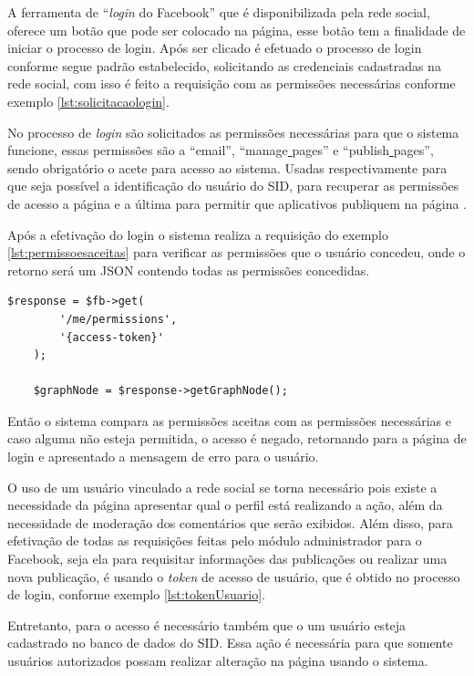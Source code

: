 A ferramenta de ``\textit{login} do Facebook'' que é disponibilizada pela rede social, oferece um botão que pode ser colocado na página, esse botão tem a finalidade de iniciar o processo de login. Após ser clicado é efetuado o processo de login conforme segue padrão estabelecido, solicitando as credenciais cadastradas na rede social, com isso é feito a requisição com as permissões necessárias conforme exemplo \ref{lst:solicitacaologin}.

No processo de \textit{login} são solicitados as permissões necessárias para que o sistema funcione, essas permissões são a “email”, “manage\underline{{ }}pages” e “publish\underline{{ }}pages”, sendo obrigatório o acete para acesso ao sistema. Usadas respectivamente para que seja possível a identificação do usuário do SID, para recuperar as permissões de acesso a página e a última para permitir que aplicativos publiquem na página \cite{facebook2018a}.

Após a efetivação do login o sistema realiza a requisição do exemplo \ref{lst:permissoesaceitas} para verificar as permissões que o usuário concedeu, onde o retorno será um JSON contendo todas as permissões concedidas.

\begin{lstlisting}[caption={Permissões concedidas},label={lst:permissoesaceitas}]
  	$response = $fb->get(
    	'/me/permissions',
		'{access-token}'
	);
	
	$graphNode = $response->getGraphNode();
\end{lstlisting}

Então o sistema compara as permissões aceitas com as permissões necessárias e caso alguma não esteja permitida, o acesso é negado, retornando para a página de login e apresentado a mensagem de erro para o usuário.

O uso de um usuário vinculado a rede social se torna necessário pois existe a necessidade da página apresentar qual o perfil está realizando a ação, além da necessidade de moderação dos comentários que serão exibidos.  Além disso, para efetivação de todas as requisições feitas pelo módulo administrador para o Facebook, seja ela para requisitar informações das publicações ou realizar uma nova publicação, é usando o \textit{token} de acesso de usuário, que é obtido no processo de login, conforme exemplo \ref{lst:tokenUsuario}.

Entretanto, para o acesso é necessário também que o um usuário esteja cadastrado no banco de dados do SID. Essa ação é necessária para que somente usuários autorizados possam realizar alteração na página usando o sistema.

